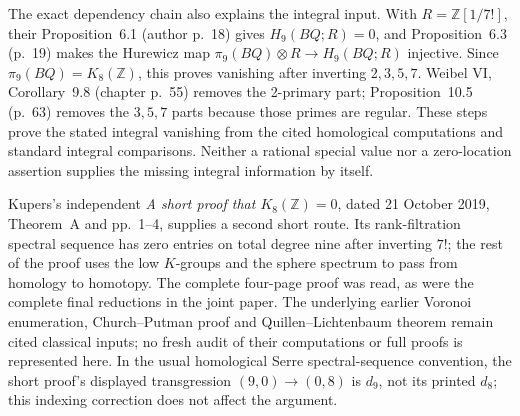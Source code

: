 The exact dependency chain also explains the integral input.
With $R=\mathbb Z[1/7!]$, their Proposition~6.1 (author p.~18)
gives $H_9(BQ;R)=0$, and Proposition~6.3 (p.~19) makes the
Hurewicz map $\pi_9(BQ)\otimes R\to H_9(BQ;R)$ injective.
Since $\pi_9(BQ)=K_8(\mathbb Z)$, this proves vanishing after
inverting $2,3,5,7$.  Weibel VI, Corollary~9.8 (chapter p.~55)
removes the 2-primary part; Proposition~10.5 (p.~63) removes
the $3,5,7$ parts because those primes are regular.
These steps prove the stated integral vanishing from the cited
homological computations and standard integral comparisons.
Neither a rational special value nor a zero-location assertion
supplies the missing integral information by itself.

Kupers's independent \emph{A short proof that $K_8(\mathbb Z)=0$},
dated 21 October 2019, Theorem~A and pp.~1--4, supplies a
second short route.  Its rank-filtration spectral sequence has
zero entries on total degree nine after inverting $7!$;
the rest of the proof uses the low $K$-groups and the sphere
spectrum to pass from homology to homotopy.  The complete
four-page proof was read, as were the complete final reductions
in the joint paper.  The underlying earlier Voronoi enumeration,
Church--Putman proof and Quillen--Lichtenbaum theorem remain
cited classical inputs; no fresh audit of their computations
or full proofs is represented here.  In the usual homological
Serre spectral-sequence convention, the short proof's displayed
transgression $(9,0)\to(0,8)$ is $d_9$, not its printed $d_8$;
this indexing correction does not affect the argument.

